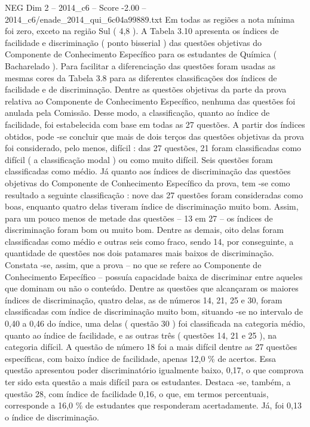\begin{textsample}{NEG Dim 2 – 2014\_c6 – Score -2.00 – 2014\_c6/enade\_2014\_qui\_6c04a99889.txt}
Em todas as regiões a nota mínima foi zero, exceto na região Sul ( 4,8 ).
A Tabela 3.10 apresenta os índices de facilidade e discriminação ( ponto bisserial ) das questões objetivas do Componente de Conhecimento Específico para os estudantes de Química ( Bacharelado ).
Para facilitar a diferenciação das questões foram usadas as mesmas cores da Tabela 3.8 para as diferentes classificações dos índices de facilidade e de discriminação.
Dentre as questões objetivas da parte da prova relativa ao Componente de Conhecimento Específico, nenhuma das questões foi anulada pela Comissão.
Desse modo, a classificação, quanto ao índice de facilidade, foi estabelecida com base em todas as 27 questões.
A partir dos índices obtidos, pode -se concluir que mais de dois terços das questões objetivas da prova foi considerado, pelo menos, difícil : das 27 questões, 21 foram classificadas como difícil ( a classificação modal ) ou como muito difícil.
Seis questões foram classificadas como médio.
Já quanto aos índices de discriminação das questões objetivas do Componente de Conhecimento Específico da prova, tem -se como resultado a seguinte classificação : nove das 27 questões foram consideradas como boas, enquanto quatro delas tiveram índice de discriminação muito bom.
Assim, para um pouco menos de metade das questões – 13 em 27 – os índices de discriminação foram bom ou muito bom.
Dentre as demais, oito delas foram classificadas como médio e outras seis como fraco, sendo 14, por conseguinte, a quantidade de questões nos dois patamares mais baixos de discriminação.
Constata -se, assim, que a prova – no que se refere ao Componente de Conhecimento Específico – possuía capacidade baixa de discriminar entre aqueles que dominam ou não o conteúdo.
Dentre as questões que alcançaram os maiores índices de discriminação, quatro delas, as de números 14, 21, 25 e 30, foram classificadas com índice de discriminação muito bom, situando -se no intervalo de 0,40 a 0,46 do índice, uma delas ( questão 30 ) foi classificada na categoria médio, quanto ao índice de facilidade, e as outras três ( questões 14, 21 e 25 ), na categoria difícil.
A questão de número 18 foi a mais difícil dentre as 27 questões específicas, com baixo índice de facilidade, apenas 12,0 \% de acertos.
Essa questão apresentou poder discriminatório igualmente baixo, 0,17, o que comprova ter sido esta questão a mais difícil para os estudantes.
Destaca -se, também, a questão 28, com índice de facilidade 0,16, o que, em termos percentuais, corresponde a 16,0 \% de estudantes que responderam acertadamente.
Já, foi 0,13 o índice de discriminação.

\end{textsample}
